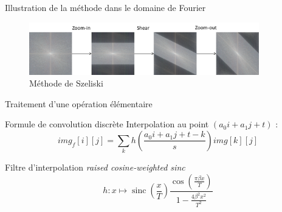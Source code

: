 \documentclass[c,12pt]{beamer}
\DeclareMathOperator{\sinc}{sinc}
\begin{document}
\begin{frame}{Illustration de la méthode dans le domaine de Fourier }

\begin{figure}
\centering
\includegraphics[width=10cm]{Schema_Spectre_Szeliski.png}
\caption{Méthode de Szeliski}
\end{figure}


\end{frame}


\begin{frame}{Traitement d'une opération élémentaire}


\begin{block}{Formule de convolution discrète}
Interpolation au point $ (a_0i+a_1j+t)$ :
	\begin{equation*}
	img_f[i][j] = \displaystyle{\sum_k}h\left(\frac{a_0i+a_1j+t-k}{s}\right)img[k][j]
	\label{formule_convolution_discrete}
	\end{equation*}

\end{block}


\begin{block}{Filtre d'interpolation }
	 \emph{raised cosine-weighted sinc}
	\begin{equation*}
	h : x \mapsto \sinc(\frac{x}{T})\frac{\cos(\frac{\pi\beta x}{T})}{1-\frac{4\beta^2x^2}{T^2}}
	\label{szeliski_definition_raisedCosineWeightedSinc}
	\end{equation*}
\end{block}

\end{frame}
\end{document}
